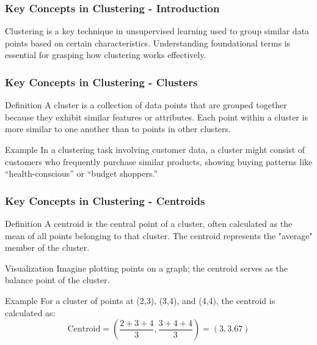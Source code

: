 \documentclass[aspectratio=169]{beamer}
\begin{document}
\begin{frame}[fragile]
    \frametitle{Key Concepts in Clustering - Introduction}
    Clustering is a key technique in unsupervised learning used to group similar data points based on certain characteristics. 
    Understanding foundational terms is essential for grasping how clustering works effectively.
\end{frame}

\begin{frame}[fragile]
    \frametitle{Key Concepts in Clustering - Clusters}
    \begin{block}{Definition}
        A cluster is a collection of data points that are grouped together because they exhibit similar features or attributes. Each point within a cluster is more similar to one another than to points in other clusters.
    \end{block}
    
    \begin{block}{Example}
        In a clustering task involving customer data, a cluster might consist of customers who frequently purchase similar products, showing buying patterns like “health-conscious” or “budget shoppers.”
    \end{block}
\end{frame}

\begin{frame}[fragile]
    \frametitle{Key Concepts in Clustering - Centroids}
    \begin{block}{Definition}
        A centroid is the central point of a cluster, often calculated as the mean of all points belonging to that cluster. 
        The centroid represents the "average" member of the cluster.
    \end{block}
    
    \begin{block}{Visualization}
        Imagine plotting points on a graph; the centroid serves as the balance point of the cluster.
    \end{block}

    \begin{block}{Example}
        For a cluster of points at (2,3), (3,4), and (4,4), the centroid is calculated as:
        \begin{equation}
            \text{Centroid} = \left( \frac{2 + 3 + 4}{3}, \frac{3 + 4 + 4}{3} \right) = (3, 3.67)
        \end{equation}
    \end{block}
\end{frame}
\end{document}
